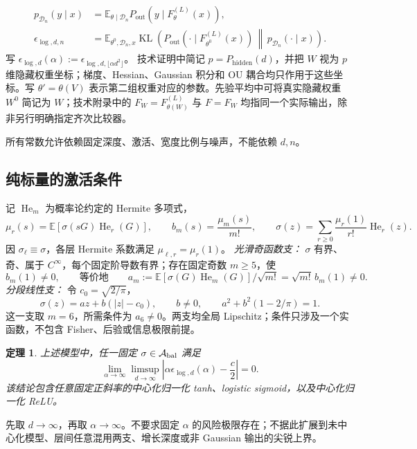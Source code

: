 \documentclass[a4paper]{tufte-handout}
\newtheorem{theorem}{定理}
\newcommand{\E}{\mathbb E}
\newcommand{\Pall}{P_{\mathrm{hidden}}}
\newcommand{\Pout}{P_{\mathrm{out}}}
\DeclareMathOperator{\KL}{KL}
\begin{document}
\begin{fullwidth}
\begin{equation}
\begin{aligned}
p_{\mathcal D_n}(y\mid x)
&=\E_{\theta\mid\mathcal D_n}\Pout\!\left(y\mid F_\theta^{(L)}(x)\right),\\
\epsilon_{\log,d,n}
&=\E_{\theta^0,\mathcal D_n,x}\KL\!\left(
\Pout\!\left(\cdot\mid F_{\theta^0}^{(L)}(x)\right)
\,\middle\|\,p_{\mathcal D_n}(\cdot\mid x)\right).
\end{aligned}\end{equation}
写 $\epsilon_{\log,d}(\alpha):=\epsilon_{\log,d,\lfloor\alpha d^2\rfloor}$。
技术证明中简记 $p=\Pall(d)$，并把 $W$ 视为 $p$ 维隐藏权重坐标；梯度、Hessian、Gaussian 积分和 OU 耦合均只作用于这些坐标。写 $\theta'=\theta(V)$ 表示第二组权重对应的参数。先验平均中可将真实隐藏权重 $W^0$ 简记为 $W$；技术附录中的 $F_W=F_{\theta(W)}^{(L)}$ 与 $F=F_W$ 均指同一个实际输出，除非另行明确指定齐次比较器。

所有常数允许依赖固定深度、激活、宽度比例与噪声，不能依赖 $d,n$。

\subsection{纯标量的激活条件}
记 $\operatorname{He}_m$ 为概率论约定的 Hermite 多项式，
\[
\mu_r(s)=\E[\sigma(sG)\operatorname{He}_r(G)],\qquad
b_m(s)=\frac{\mu_m(s)}{m!},\qquad
\sigma(z)=\sum_{r\ge0}\frac{\mu_r(1)}{r!}\operatorname{He}_r(z).
\]
因 $\sigma_\ell\equiv\sigma$，各层 Hermite 系数满足 $\mu_{\ell,r}=\mu_r(1)$。
\emph{光滑奇函数支：} $\sigma$ 有界、奇、属于 $C^\infty$，每个固定阶导数有界；存在固定奇数 $m\ge5$，使
\begin{equation}\label{eq:scalar}
b_m(1)\neq0,\qquad\text{等价地}\qquad
a_m:=\E[\sigma(G)\operatorname{He}_m(G)]/\sqrt{m!}=\sqrt{m!}\,b_m(1)\neq0.
\end{equation}
\emph{分段线性支：} 令 $c_0=\sqrt{2/\pi}$，
\begin{equation}\label{eq:pl}
\sigma(z)=az+b(|z|-c_0),\qquad
b\ne0,\qquad a^2+b^2(1-2/\pi)=1.
\end{equation}
这一支取 $m=6$，所需条件为 $a_6\neq0$。两支均全局 Lipschitz；条件只涉及一个实函数，不包含 Fisher、后验或信息极限前提。

\begin{theorem}\label{thm:main}
上述模型中，任一固定 $\sigma\in\mathcal A_{\rm bal}$ 满足
\begin{equation}\label{eq:main}
\boxed{\lim_{\alpha\to\infty}\limsup_{d\to\infty}
\left|\alpha \epsilon_{\log,d}(\alpha)-\frac c2\right|=0.}
\end{equation}
该结论包含任意固定正斜率的中心化归一化 tanh、logistic sigmoid，以及中心化归一化 ReLU。
\end{theorem}
先取 $d\to\infty$，再取 $\alpha\to\infty$。不要求固定 $\alpha$ 的风险极限存在；不据此扩展到未中心化模型、层间任意混用两支、增长深度或非 Gaussian 输出的尖锐上界。


\end{fullwidth}
\end{document}
